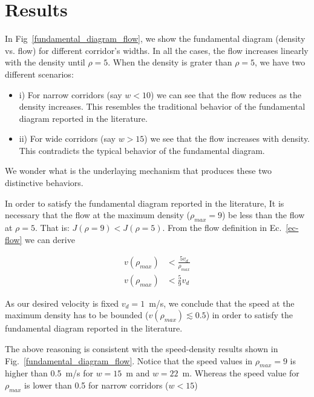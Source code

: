 \section{\label{results}Results}

In Fig~\ref{fundamental_diagram_flow}, we show the fundamental diagram (density vs. flow) for different corridor's widths. In all the cases, the flow increases linearly with the density until $\rho=5$. When the density is grater than $\rho = 5$, we have two different scenarios:


\begin{itemize}
\item i) For narrow corridors (say $w < 10$) we can see that the flow reduces as the density increases. This resembles the traditional behavior of the fundamental diagram reported in the literature. 
\item ii) For wide corridors (say $w > 15$) we see that the flow increases with density. This contradicts the typical behavior of the fundamental diagram.   
\end{itemize}

We wonder what is the underlaying mechanism that produces these two distinctive behaviors. 

In order to satisfy the fundamental diagram reported in the literature, It is necessary that the flow at the maximum density ($\rho_{max} = 9$) be less than the flow at $\rho = 5$. That is:  $J(\rho = 9) < J(\rho = 5)$. From the flow definition in Ec.~\ref{ec-flow} we can derive

\begin{align*} 
v(\rho_{max}) &< \frac{5v_d}{\rho_{max}} \\
v(\rho_{max}) &< \frac{5}{9} v_d
\end{align*}



As our desired velocity is fixed $v_d = 1$~m/s, we conclude that the speed at the maximum density has to be bounded ($v(\rho_{max}) \lesssim 	0.5$) in order to satisfy the fundamental diagram reported in the literature.   

The above reasoning is consistent with the speed-density results shown in Fig.~\ref{fundamental_diagram_flow}. Notice that the speed values in $\rho_{max} = 9$ is higher than 0.5~m/s for $w=15$~m and $w=22$~m. Whereas the speed value for $\rho_{max}$ is lower than 0.5 for narrow corridors ($w<15$)

